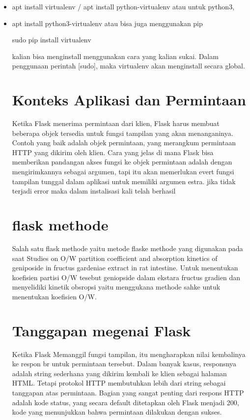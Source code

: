 \begin{itemize}
	\item apt install virtualenv / apt install python-virtualenv
atau untuk python3,
	\item apt install python3-virtualenv
atau bisa juga menggunakan pip
	\item [sudo] pip install virtualenv
\begin{itemize}
kalian bisa menginstall menggunakan cara yang kalian sukai. Dalam penggunaan perintah [sudo], maka virtualenv akan menginstall
secara global.

\section{Konteks Aplikasi dan Permintaan}
Ketika Flask menerima permintaan dari klien, Flask harus membuat beberapa objek tersedia untuk fungsi tampilan yang akan menanganinya. Contoh yang baik adalah objek permintaan, yang merangkum permintaan HTTP yang dikirim oleh klien. Cara yang jelas di mana Flask bisa memberikan pandangan akses fungsi ke objek permintaan adalah dengan mengirimkannya sebagai argumen, tapi itu akan memerlukan evert fungsi tampilan tunggal dalam aplikasi untuk memiliki argumen estra.
jika tidak terjadi error maka dalam instalisasi kali telah berhasil

\section{flask methode}
Salah satu flask methode yaitu metode flaske methode yang digunakan pada saat Studies on O/W partition coefficient and absorption kinetics of geniposide in fructus gardeniae extract in rat intestine. Untuk menentukan koefisien partisi O/W tesebut geniopside dalam ekstara fructus gradien dan menyelidiki kinetik obsropsi yaitu menggukana methode sahke untuk menentukan koefisien O/W.

\section{Tanggapan megenai Flask}
Ketika Flask Memanggil fungsi tampilan, itu mengharapkan nilai kembalinya ke respon br untuk permintaan tersebut. Dalam banyak kasus, responsnya adalah string sederhana yang dikirim kembali ke klien sebagai halaman HTML. Tetapi protokol HTTP membutuhkan lebih dari string sebagai tanggapan atas permintaan. Bagian yang sangat penting dari respons HTTP adalah kode status, yang secara default ditetapkan oleh Flask menjadi 200, kode yang menunjukkan bahwa permintaan dilakukan dengan sukses.


\end{itemize}
\end{itemize}
